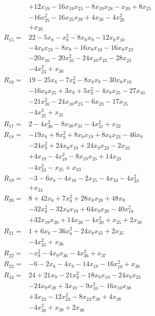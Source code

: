 \begin{align*}
&+12x_{19} -16x_{19}x_{25} -8x_{19}x_{28} -x_{20} +8x_{25}\\
&-16x_{25}^{2} -16x_{25}x_{28} +4x_{28} -4x_{28}^{2}\\
&+x_{29}\\[3pt]
R_{15}={}&22 -5x_{8} -x_{8}^{2} -8x_{8}x_{9} -12x_{8}x_{10}\\
&-4x_{8}x_{23} -8x_{9} -16x_{9}x_{10} -16x_{9}x_{23}\\
&-20x_{10} -20x_{10}^{2} -24x_{10}x_{23} -28x_{23}\\
&-4x_{23}^{2} +x_{30}\\[3pt]
R_{16}={}&19 -25x_{8} -7x_{8}^{2} -8x_{8}x_{9} -30x_{8}x_{10}\\
&-16x_{8}x_{25} +3x_{9} +5x_{9}^{2} -4x_{9}x_{25} -27x_{10}\\
&-21x_{10}^{2} -24x_{10}x_{25} -6x_{23} -17x_{25}\\
&-4x_{25}^{2} +x_{31}\\[3pt]
R_{17}={}&2 -4x_{30}^{2} -8x_{30}x_{31} -4x_{31}^{2} +x_{32}\\[3pt]
R_{18}={}&-19x_{8} +8x_{8}^{2} +8x_{8}x_{19} +8x_{8}x_{23} -46x_{9}\\
&-24x_{9}^{2} +24x_{9}x_{19} +24x_{9}x_{23} -2x_{10}\\
&+4x_{19} -4x_{19}^{2} -8x_{19}x_{23} +14x_{23}\\
&-4x_{23}^{2} -x_{25} +x_{33}\\[3pt]
R_{19}={}&-3 -6x_{8} -4x_{10} -2x_{25} -4x_{33} -4x_{33}^{2}\\
&+x_{34}\\[3pt]
R_{20}={}&8 +42x_{8} +7x_{8}^{2} +28x_{8}x_{20} +48x_{9}\\
&-32x_{9}^{2} -32x_{9}x_{19} +64x_{9}x_{20} -40x_{19}^{2}\\
&+32x_{19}x_{20} +14x_{20} -4x_{20}^{2} +x_{35} +2x_{38}\\[3pt]
R_{21}={}&1 +6x_{8} -36x_{8}^{2} -24x_{8}x_{35} +2x_{35}\\
&-4x_{35}^{2} +x_{36}\\[3pt]
R_{22}={}&-x_{9}^{2} -4x_{9}x_{36} -4x_{36}^{2} +x_{37}\\[3pt]
R_{23}={}&-6 -2x_{8} -4x_{9} -14x_{19} -16x_{19}^{2} +x_{38}\\[3pt]
R_{24}={}&24 +21x_{9} -21x_{9}^{2} -18x_{9}x_{10} -24x_{9}x_{23}\\
&-24x_{9}x_{38} +3x_{10} -9x_{10}^{2} -16x_{10}x_{38}\\
&+3x_{23} -12x_{23}^{2} -8x_{23}x_{38} +4x_{38}\\
&-4x_{38}^{2} +x_{39} +2x_{46}\\[3pt]

\end{align*}
